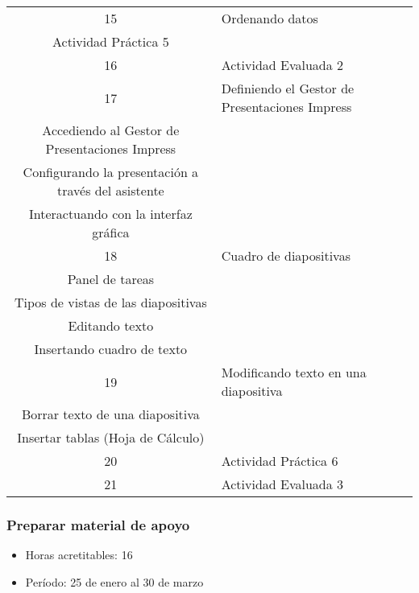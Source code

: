 \begin{center}
\begin{tabular}{|c|p{10cm}|}
                        15 & \raggedright Ordenando datos
                        \\ Actividad Práctica 5
                        \tabularnewline \hline
                        
                        16 & \raggedright Actividad Evaluada 2
                        \tabularnewline \hline

                        17 & \raggedright Definiendo el Gestor de Presentaciones Impress
                        \\ Accediendo al Gestor de Presentaciones Impress
                        \\ Configurando la presentación a través del asistente
                        \\ Interactuando con la interfaz gráfica
                        \tabularnewline \hline
                        
                        18 & \raggedright Cuadro de diapositivas
                        \\ Panel de tareas
                        \\ Tipos de vistas de las diapositivas
                        \\ Editando texto
                        \\ Insertando cuadro de texto
                        \tabularnewline \hline
                        19 & \raggedright Modificando texto en una diapositiva
                        \\ Borrar texto de una diapositiva
                        \\ Insertar tablas (Hoja de Cálculo)
                        \tabularnewline \hline
                        
                        20 & \raggedright Actividad Práctica 6
                        \tabularnewline \hline
                        21 & \raggedright Actividad Evaluada 3
                        \tabularnewline \hline
                        
            \end{tabular}                                
            \end{center}	 
             \subsubsection {Preparar material de apoyo}
             \begin{itemize}
                 \item Horas acretitables: 16
                 \item Período: 25 de enero al 30 de marzo
                \end{itemize}
                

